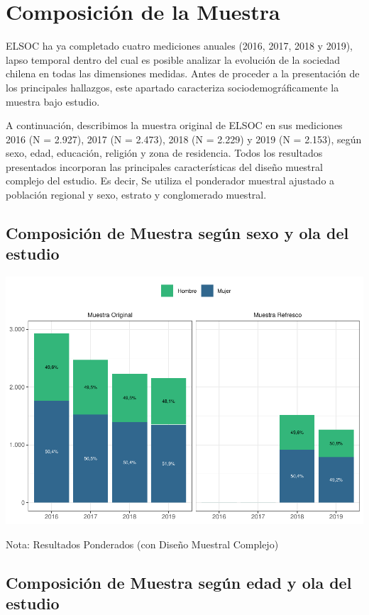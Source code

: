 \documentclass[
  12pt,
]{book}
\begin{document}
\hypertarget{composiciuxf3n-de-la-muestra}{%
\chapter{Composición de la Muestra}\label{composiciuxf3n-de-la-muestra}}

ELSOC ha ya completado cuatro mediciones anuales (2016, 2017, 2018 y 2019), lapso temporal dentro del cual es posible analizar la evolución de la sociedad chilena en todas las dimensiones medidas. Antes de proceder a la presentación de los principales hallazgos, este apartado caracteriza sociodemográficamente la muestra bajo estudio.

A continuación, describimos la muestra original de ELSOC en sus mediciones 2016 (N = 2.927), 2017 (N = 2.473), 2018 (N = 2.229) y 2019 (N = 2.153), según sexo, edad, educación, religión y zona de residencia. Todos los resultados presentados incorporan las principales características del diseño muestral complejo del estudio. Es decir, Se utiliza el ponderador muestral ajustado a población regional y sexo, estrato y conglomerado muestral.

\hypertarget{composiciuxf3n-de-muestra-seguxfan-sexo-y-ola-del-estudio}{%
\section{Composición de Muestra según sexo y ola del estudio}\label{composiciuxf3n-de-muestra-seguxfan-sexo-y-ola-del-estudio}}

\begin{center}\includegraphics[width=0.75\linewidth]{concepto-medicion_files/figure-latex/unnamed-chunk-11-1} \end{center}

Nota: Resultados Ponderados (con Diseño Muestral Complejo)

\hypertarget{composiciuxf3n-de-muestra-seguxfan-edad-y-ola-del-estudio}{%
\section{Composición de Muestra según edad y ola del estudio}\label{composiciuxf3n-de-muestra-seguxfan-edad-y-ola-del-estudio}}
\end{document}
